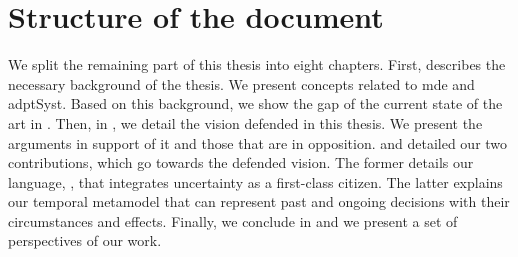 \section{Structure of the document}

We split the remaining part of this thesis into eight chapters.
First,  describes the necessary background of the thesis.
We present concepts related to \gls{mde} and \gls{adptSyst}.
Based on this background, we show the gap of the current state of the art in .
Then, in , we detail the vision defended in this thesis.
We present the arguments in support of it and those that are in opposition.
 and  detailed our two contributions, which go towards the defended vision.
The former details our language, \langName, that integrates uncertainty as a first-class citizen.
The latter explains our temporal metamodel that can represent past and ongoing decisions with their circumstances and effects.
Finally, we conclude in  and we present a set of perspectives of our work.